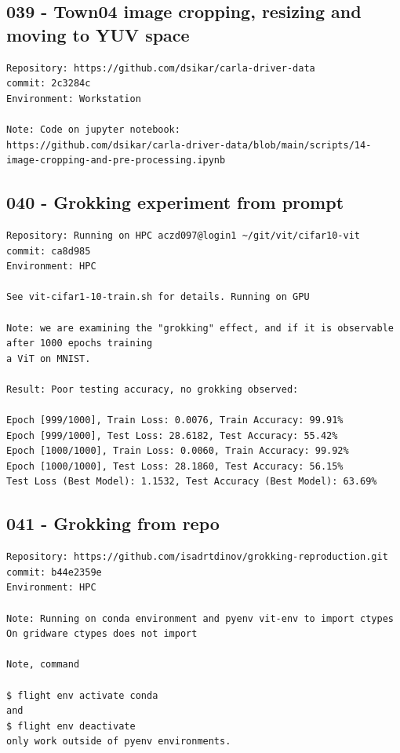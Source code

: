 \subsection{039 - Town04 image cropping, resizing and moving to YUV space}
\label{app_res:038}
\begin{verbatim}
Repository: https://github.com/dsikar/carla-driver-data
commit: 2c3284c
Environment: Workstation

Note: Code on jupyter notebook:
https://github.com/dsikar/carla-driver-data/blob/main/scripts/14-image-cropping-and-pre-processing.ipynb

\end{verbatim}

\subsection{040 - Grokking experiment from prompt}
\label{app_res:040}
\begin{verbatim}
Repository: Running on HPC aczd097@login1 ~/git/vit/cifar10-vit
commit: ca8d985
Environment: HPC

See vit-cifar1-10-train.sh for details. Running on GPU

Note: we are examining the "grokking" effect, and if it is observable after 1000 epochs training
a ViT on MNIST.

Result: Poor testing accuracy, no grokking observed:

Epoch [999/1000], Train Loss: 0.0076, Train Accuracy: 99.91%
Epoch [999/1000], Test Loss: 28.6182, Test Accuracy: 55.42%
Epoch [1000/1000], Train Loss: 0.0060, Train Accuracy: 99.92%
Epoch [1000/1000], Test Loss: 28.1860, Test Accuracy: 56.15%
Test Loss (Best Model): 1.1532, Test Accuracy (Best Model): 63.69%

\end{verbatim}

\subsection{041 - Grokking from repo}
\label{app_res:041}
\begin{verbatim}
Repository: https://github.com/isadrtdinov/grokking-reproduction.git 
commit: b44e2359e
Environment: HPC

Note: Running on conda environment and pyenv vit-env to import ctypes
On gridware ctypes does not import

Note, command

$ flight env activate conda
and
$ flight env deactivate
only work outside of pyenv environments.

\end{verbatim}

